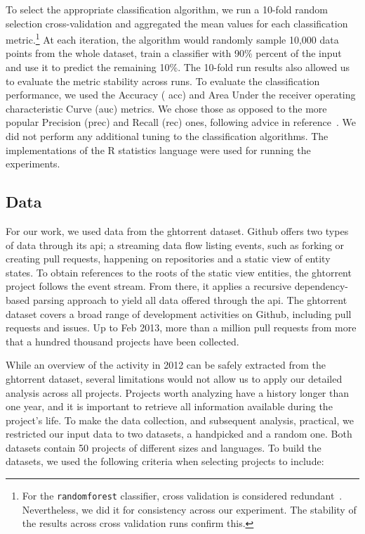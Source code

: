 \documentclass{sig-alternate}
\begin{document}
To select the appropriate classification algorithm, we run a 10-fold random
selection cross-validation and aggregated the mean values for each
classification metric.\footnote{For the \texttt{randomforest} classifier, cross
validation is considered redundant~\cite{Breim01}. Nevertheless, we did it for
consistency across our experiment. The stability of the results 
across cross validation runs confirm this.} At each iteration, the algorithm would
randomly sample 10,000 data points from the whole dataset, train a classifier
with 90\% percent of the input and use it to predict the remaining 10\%. The
10-fold run results also allowed us to evaluate the metric stability across
runs. To evaluate the classification performance, we used the Accuracy ({\sc
acc}) and Area Under the receiver operating characteristic Curve ({\sc auc})
metrics. We chose those as opposed to the more popular Precision ({\sc prec})
and Recall ({\sc rec}) ones, following advice in reference~\cite{Lessm08}. We
did not perform any additional tuning to the classification algorithms. The
implementations of the R statistics language were used for running the
experiments.

\subsection{Data}
\label{sec:expdata}
For our work, we used data from the {\sc ght}orrent dataset.
Github offers two types of data through its {\sc api}; a streaming data flow
listing events, such as forking or creating pull requests, happening on
repositories and a static view of entity states. To obtain references to the
roots of the static view entities, the {\sc ght}orrent project follows the event
stream. From there, it applies a recursive dependency-based parsing approach to
yield all data offered through the {\sc api}. The {\sc ght}orrent dataset covers a
broad range of development activities on Github, including pull requests and
issues. Up to Feb 2013, more than a million pull requests from more that a
hundred thousand projects have been collected.

While an overview of the activity in 2012 can be safely extracted from the {\sc
ght}orrent dataset, several limitations would not allow us to apply our detailed
analysis across all projects. Projects worth analyzing have a history longer
than one year, and it is important to retrieve all information available during
the project's life. To make the data collection, and subsequent analysis,
practical, we restricted our input data to two datasets, a \textsf{handpicked}
and a \textsf{random} one. Both datasets contain 50 projects of different sizes
and languages. To build the datasets, we used the following criteria when
selecting projects to include:
\end{document}
